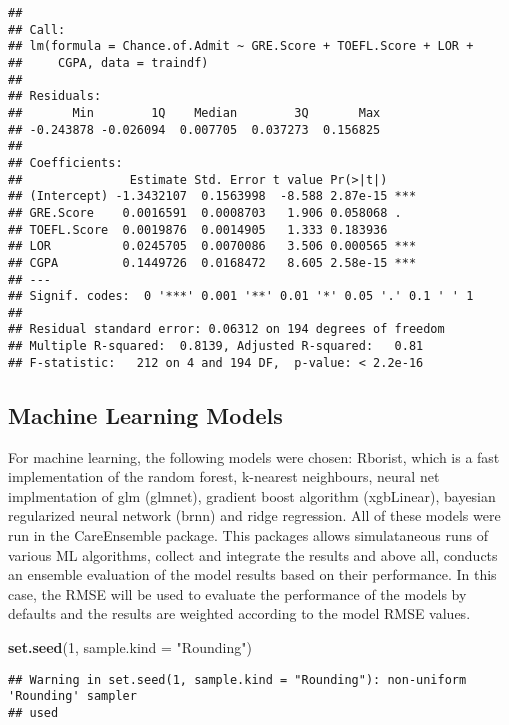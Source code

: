 \documentclass[11pt,]{article}
\newenvironment{Shaded}{\begin{snugshade}}{\end{snugshade}}
\newcommand{\DataTypeTok}[1]{\textcolor[rgb]{0.13,0.29,0.53}{#1}}
\newcommand{\DecValTok}[1]{\textcolor[rgb]{0.00,0.00,0.81}{#1}}
\newcommand{\KeywordTok}[1]{\textcolor[rgb]{0.13,0.29,0.53}{\textbf{#1}}}
\newcommand{\NormalTok}[1]{#1}
\newcommand{\StringTok}[1]{\textcolor[rgb]{0.31,0.60,0.02}{#1}}
\begin{document}
\begin{verbatim}
## 
## Call:
## lm(formula = Chance.of.Admit ~ GRE.Score + TOEFL.Score + LOR + 
##     CGPA, data = traindf)
## 
## Residuals:
##       Min        1Q    Median        3Q       Max 
## -0.243878 -0.026094  0.007705  0.037273  0.156825 
## 
## Coefficients:
##               Estimate Std. Error t value Pr(>|t|)    
## (Intercept) -1.3432107  0.1563998  -8.588 2.87e-15 ***
## GRE.Score    0.0016591  0.0008703   1.906 0.058068 .  
## TOEFL.Score  0.0019876  0.0014905   1.333 0.183936    
## LOR          0.0245705  0.0070086   3.506 0.000565 ***
## CGPA         0.1449726  0.0168472   8.605 2.58e-15 ***
## ---
## Signif. codes:  0 '***' 0.001 '**' 0.01 '*' 0.05 '.' 0.1 ' ' 1
## 
## Residual standard error: 0.06312 on 194 degrees of freedom
## Multiple R-squared:  0.8139, Adjusted R-squared:   0.81 
## F-statistic:   212 on 4 and 194 DF,  p-value: < 2.2e-16
\end{verbatim}

\hypertarget{machine-learning-models}{%
\subsection{Machine Learning Models}\label{machine-learning-models}}

For machine learning, the following models were chosen: Rborist, which
is a fast implementation of the random forest, k-nearest neighbours,
neural net implmentation of glm (glmnet), gradient boost algorithm
(xgbLinear), bayesian regularized neural network (brnn) and ridge
regression. All of these models were run in the CareEnsemble package.
This packages allows simulataneous runs of various ML algorithms,
collect and integrate the results and above all, conducts an ensemble
evaluation of the model results based on their performance. In this
case, the RMSE will be used to evaluate the performance of the models by
defaults and the results are weighted according to the model RMSE
values.

\begin{Shaded}
\begin{Highlighting}[]
\KeywordTok{set.seed}\NormalTok{(}\DecValTok{1}\NormalTok{, }\DataTypeTok{sample.kind =} \StringTok{"Rounding"}\NormalTok{)}
\end{Highlighting}
\end{Shaded}

\begin{verbatim}
## Warning in set.seed(1, sample.kind = "Rounding"): non-uniform 'Rounding' sampler
## used
\end{verbatim}
\end{document}
